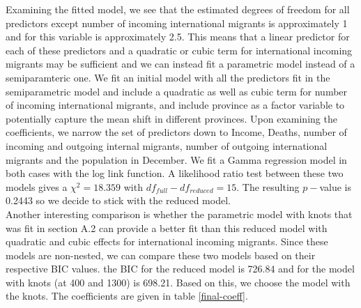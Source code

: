 \documentclass[paper=a4, fontsize=11pt]{scrartcl} %
\numberwithin{equation}{section} %
\begin{document}
Examining the fitted model, we see that the estimated degrees of freedom for all predictors except number of incoming international migrants is approximately 1 and for this variable is approximately 2.5. This means that a linear predictor for each of these predictors and a quadratic or cubic term for international incoming migrants may be sufficient and we can instead fit a parametric model instead of a semiparamteric one. We fit an initial model with all the predictors fit in the semiparametric model and include a quadratic as well as cubic term for number of incoming international migrants, and include province as a factor variable to potentially capture the mean shift in different provinces. Upon examining the coefficients, we narrow the set of predictors down to Income, Deaths, number of incoming and outgoing internal migrants, number of outgoing international migrants and the population in December. We fit a Gamma regression model in both cases with the log link function. A likelihood ratio test between these two models gives a $\chi^2= 18.359$ with $df_{full}-df_{reduced}=15$. The resulting $p-$value is 0.2443 so we decide to stick with the reduced model.\\ 

Another interesting comparison is whether the parametric model with knots that was fit in section A.2 can provide a better fit than this reduced model with quadratic and cubic effects for international incoming migrants. Since these models are non-nested, we can compare these two models based on their respective BIC values. the BIC for the reduced model is 726.84 and for the model with knots (at 400 and 1300) is 698.21. Based on this, we choose the model with the knots. The coefficients are given in table \ref{final-coeff}.\\
\end{document}

